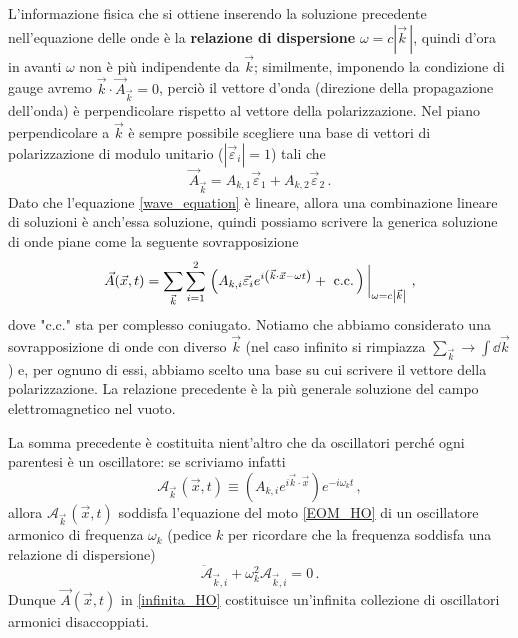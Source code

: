 \noindent L'informazione fisica che si ottiene inserendo la soluzione precedente nell'equazione delle onde è la \textbf{relazione di dispersione} $\omega = c |\vec{k}\,|$, quindi d'ora in avanti $\omega$ non è più indipendente da $\vec{k}$; similmente, imponendo la condizione di gauge avremo $\vec{k} \cdot \vec{A}_{\vec{k}} = 0$, perciò il vettore d'onda (direzione della propagazione dell'onda) è perpendicolare rispetto al vettore della polarizzazione. Nel piano perpendicolare a $\vec{k}$ è sempre possibile scegliere una base di vettori di polarizzazione di modulo unitario ($|\vec{\varepsilon}_i| = 1$) tali che 
\begin{equation*}
    \vec{A}_{\vec{k}} = A_{k,1} \vec{\varepsilon}_1 + A_{k,2} \vec{\varepsilon}_2 \, .
\end{equation*}
Dato che l'equazione \eqref{wave_equation} è lineare, allora una combinazione lineare di soluzioni è anch'essa soluzione, quindi possiamo scrivere la generica soluzione di onde piane come la seguente sovrapposizione
\begin{equation}\label{infinita_HO}
    \vec{A}(\vec{x}, t) = \sum_{\vec{k}} \sum_{i=1}^2 \eval{\left( A_{k,i} \vec{\varepsilon}_i e^{i \left( \vec{k} \cdot \vec{x} - \omega t \right)} + \text{ c.c.} \, \right)}_{\omega = c \abs{\vec{k}}} \, ,
\end{equation}
dove "c.c." sta per complesso coniugato. Notiamo che abbiamo considerato una sovrapposizione di onde con diverso $\vec{k}$ (nel caso infinito si rimpiazza $\sum_{\vec{k}} \to \int \dd{\vec{k}}$) e, per ognuno di essi, abbiamo scelto una base su cui scrivere il vettore della polarizzazione. La relazione precedente è la più generale soluzione del campo elettromagnetico nel vuoto.

\noindent La somma precedente è costituita nient'altro che da oscillatori perché ogni parentesi è un oscillatore: se scriviamo infatti
\begin{equation*}
    \mathcal{A}_{\vec{k}\,}(\vec{x}, t) \equiv \left( A_{k,i} e^{i \vec{k} \cdot \vec{x}} \right) e^{-i \omega_k t} \, ,
\end{equation*}
allora $\mathcal{A}_{\vec{k}\,}(\vec{x}, t)$ soddisfa l'equazione del moto \eqref{EOM_HO} di un oscillatore armonico di frequenza $\omega_k$ (pedice $k$ per ricordare che la frequenza soddisfa una relazione di dispersione)
\begin{equation*}
    \ddot{\mathcal{A}}_{\vec{k},i} + \omega_k^2 \mathcal{A}_{\vec{k},i} = 0 \, .
\end{equation*}
Dunque $\vec{A}(\vec{x}, t)$ in \eqref{infinita_HO} costituisce un'infinita collezione di oscillatori armonici disaccoppiati. 

